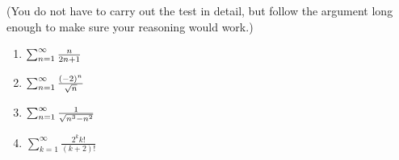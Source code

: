 (You do not have to carry out the test in detail, but follow the argument long enough to make sure your reasoning would work.)

\begin{enumerate}

\item \(\sum_{n=1}^\infty \frac{n}{2n+1}\)\vspace*{.75in}

\item \(\sum_{n=1}^\infty \frac{(-2)^n}{\sqrt{n}}\)\vspace*{.75in}

\item \(\sum_{n=1}^\infty \frac{1}{\sqrt{n^3-n^2}}\)\vspace*{.75in}

\item \(\sum_{k=1}^\infty \frac{2^k k!}{(k+2)!}\)\vspace*{.75in}


\end{enumerate}



